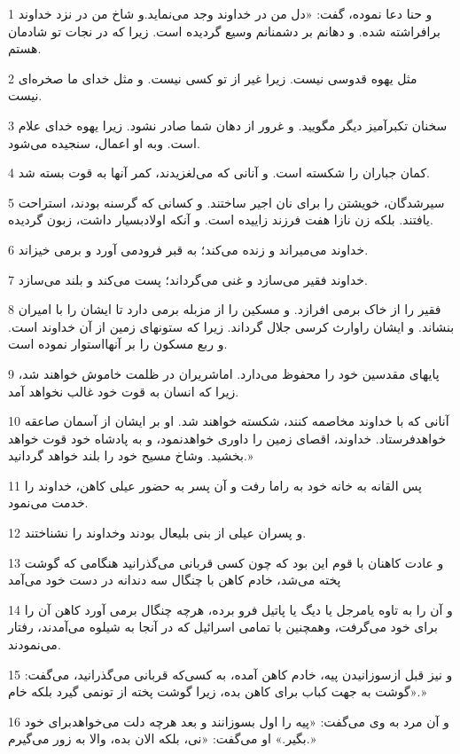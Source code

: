 \par 1 و حنا دعا نموده، گفت: «دل من در خداوند وجد می‌نماید.و شاخ من در نزد خداوند برافراشته شده. و دهانم بر دشمنانم وسیع گردیده است. زیرا که در نجات تو شادمان هستم.
\par 2 مثل یهوه قدوسی نیست. زیرا غیر از تو کسی نیست. و مثل خدای ما صخره‌ای نیست.
\par 3 سخنان تکبرآمیز دیگر مگویید. و غرور از دهان شما صادر نشود. زیرا یهوه خدای علام است. وبه او اعمال، سنجیده می‌شود.
\par 4 کمان جباران را شکسته است. و آنانی که می‌لغزیدند، کمر آنها به قوت بسته شد.
\par 5 سیرشدگان، خویشتن را برای نان اجیر ساختند. و کسانی که گرسنه بودند، استراحت یافتند. بلکه زن نازا هفت فرزند زاییده است. و آنکه اولادبسیار داشت، زبون گردیده.
\par 6 خداوند می‌میراند و زنده می‌کند؛ به قبر فرودمی آورد و برمی خیزاند.
\par 7 خداوند فقیر می‌سازد و غنی می‌گرداند؛ پست می‌کند و بلند می‌سازد.
\par 8 فقیر را از خاک برمی افرازد. و مسکین را از مزبله برمی دارد تا ایشان را با امیران بنشاند. و ایشان راوارث کرسی جلال گرداند. زیرا که ستونهای زمین از آن خداوند است. و ربع مسکون را بر آنهااستوار نموده است.
\par 9 پایهای مقدسین خود را محفوظ می‌دارد. اماشریران در ظلمت خاموش خواهند شد، زیرا که انسان به قوت خود غالب نخواهد آمد.
\par 10 آنانی که با خداوند مخاصمه کنند، شکسته خواهند شد. او بر ایشان از آسمان صاعقه خواهدفرستاد. خداوند، اقصای زمین را داوری خواهدنمود، و به پادشاه خود قوت خواهد بخشید. وشاخ مسیح خود را بلند خواهد گردانید.»
\par 11 پس القانه به خانه خود به راما رفت و آن پسر به حضور عیلی کاهن، خداوند را خدمت می‌نمود.
\par 12 و پسران عیلی از بنی بلیعال بودند وخداوند را نشناختند.
\par 13 و عادت کاهنان با قوم این بود که چون کسی قربانی می‌گذرانید هنگامی که گوشت پخته می‌شد، خادم کاهن با چنگال سه دندانه در دست خود می‌آمد
\par 14 و آن را به تاوه یامرجل یا دیگ یا پاتیل فرو برده، هر‌چه چنگال برمی آورد کاهن آن را برای خود می‌گرفت، وهمچنین با تمامی اسرائیل که در آنجا به شیلوه می‌آمدند، رفتار می‌نمودند.
\par 15 و نیز قبل ازسوزانیدن پیه، خادم کاهن آمده، به کسی‌که قربانی می‌گذرانید، می‌گفت: «گوشت به جهت کباب برای کاهن بده، زیرا گوشت پخته از تونمی گیرد بلکه خام.»
\par 16 و آن مرد به وی می‌گفت: «پیه را اول بسوزانند و بعد هر‌چه دلت می‌خواهدبرای خود بگیر.» او می‌گفت: «نی، بلکه الان بده، والا به زور می‌گیرم.»

